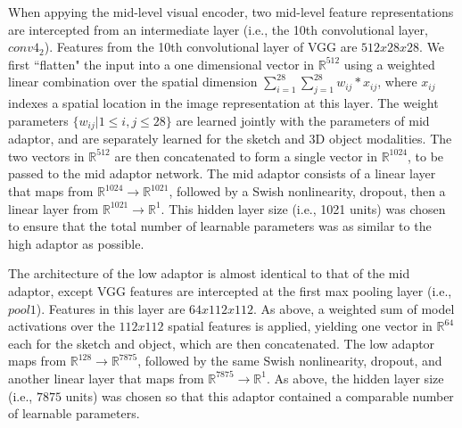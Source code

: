 \documentclass[9pt,twocolumn,twoside]{pnas-new}
\begin{document}
{When appying the mid-level visual encoder, two mid-level feature representations are intercepted from an intermediate layer (i.e., the 10th convolutional layer, $conv4_2$).
Features from the 10th convolutional layer of VGG are $512 x 28 x 28$.
We first ``flatten" the input into a one dimensional vector in $\mathbb{R}^{512}$ using a weighted linear combination over the spatial dimension $\sum_{i=1}^{28}\sum_{j=1}^{28} w_{ij} * x_{ij}$, where $x_{ij}$ indexes a spatial location in the image representation at this layer. 
The weight parameters $\{w_{ij}|1\leq i,j \leq 28\}$ are learned jointly with the parameters of mid adaptor, and are separately learned for the sketch and 3D object modalities. 
The two vectors in $\mathbb{R}^{512}$ are then concatenated to form a single vector in $\mathbb{R}^{1024}$, to be passed to the mid adaptor network. 
The mid adaptor consists of a linear layer that maps from $\mathbb{R}^{1024} \rightarrow \mathbb{R}^{1021}$, followed by a Swish nonlinearity, dropout, then a linear layer from $\mathbb{R}^{1021} \rightarrow \mathbb{R}^{1}$. 
This hidden layer size (i.e., 1021 units) was chosen to ensure that the total number of learnable parameters was as similar to the high adaptor as possible. 

The architecture of the low adaptor is almost identical to that of the mid adaptor, except VGG features are intercepted at the first max pooling layer (i.e., $pool1$).
Features in this layer are $64 x 112 x 112$. As above, a weighted sum of model activations over the $112 x 112$ spatial features is applied, yielding one vector in $\mathbb{R}^{64}$ each for the sketch and object, which are then concatenated. 
The low adaptor maps from $\mathbb{R}^{128} \rightarrow \mathbb{R}^{7875}$, followed by the same Swish nonlinearity, dropout, and another linear layer that maps from $\mathbb{R}^{7875} \rightarrow \mathbb{R}^{1}$. 
As above, the hidden layer size (i.e., $7875$ units) was chosen so that this adaptor contained a comparable number of learnable parameters. 


}
\end{document}

